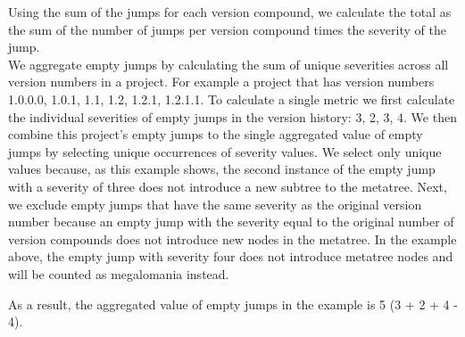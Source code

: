 \documentclass[conference]{IEEEtran}
\begin{document}
Using the sum of the jumps for each version compound, we calculate the total \numberichoices as the sum of the number of jumps per version compound times the severity of the jump. \\

%


We aggregate empty jumps by calculating the sum of unique severities across all version numbers in a project. 
For example a project that has version numbers 1.0.0.0, 1.0.1, 1.1, 1.2, 1.2.1, 1.2.1.1.
To calculate a single metric we first calculate the individual severities of empty jumps in the version history: 3, 2, 3, 4.
We then combine this project's empty jumps to the single aggregated value of empty jumps by selecting unique occurrences of severity values.
We select only unique values because, as this example shows, the second instance of the empty jump with a severity of three does not introduce a new subtree to the metatree.
Next, we exclude empty jumps that have the same severity as the original version number because an empty jump with the severity equal to the original number of version compounds does not introduce new nodes in the metatree.
In the example above, the empty jump with severity four does not introduce metatree nodes and will be counted as megalomania instead.

As a result, the aggregated value of empty jumps in the example is 5 (3 + 2 + 4 - 4).
\\

\end{document}
